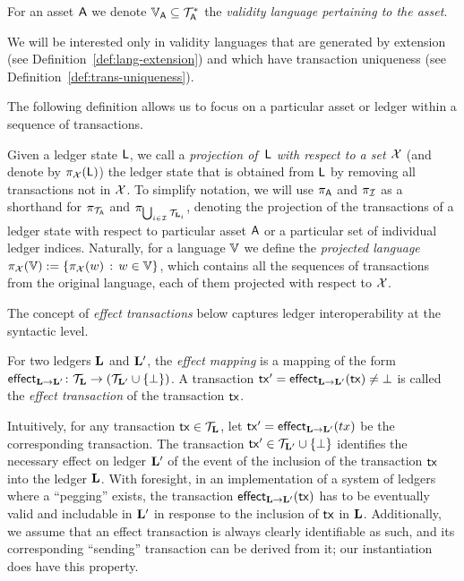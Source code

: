 \begin{definition}
  For an asset $\mathsf{A}$ we denote $\mathbb{V}_{\mathsf{A}} \subseteq \mathcal{T}_{\mathsf{A}}^*$
  the \emph{validity language pertaining to the asset}.
\end{definition}

We will be interested only in validity languages that are generated by extension
(see Definition~\ref{def:lang-extension}) and which have transaction uniqueness
(see Definition~\ref{def:trans-uniqueness}).

The following definition allows us to focus on a particular asset or ledger
within a sequence of transactions.

\begin{definition}
  Given a ledger state $\mathsf{L}$, we call a
  \emph{projection of~$\mathsf{L}$ with respect to a set $\mathcal{X}$}
  (and denote by $\pi_{\mathcal{X}}(\mathsf{L})$) the ledger state that is obtained from
  $\mathsf{L}$ by removing all transactions not in $\mathcal{X}$. To simplify
  notation, we will use $\pi_{\mathsf{A}}$ and $\pi_{\mathcal{I}}$ as a shorthand for
  $\pi_{\mathcal{T}_{\mathsf{A}}}$ and $\pi_{\bigcup_{i\in\mathcal{I}} \mathcal{T}_{\mathbf{L}_i}}$,
  denoting the projection of the transactions of a ledger state with respect to
  particular asset $\mathsf{A}$ or a particular set of individual ledger
  indices.
  Naturally, for a language $\mathbb{V}$ we define the
  \emph{projected language}
  $\pi_{\mathcal{X}}(\mathbb{V}):=\left\{ \pi_{\mathcal{X}}(w) \,:\, w\in\mathbb{V} \right\}$, which
  contains all the sequences of transactions from the original language,
  each of them projected with respect to $\mathcal{X}$.
\end{definition}

The concept of {\em effect transactions} below captures ledger interoperability
at the syntactic level.

\begin{definition}
\label{def:effect}
For two ledgers $\mathbf{L}$ and $\mathbf{L}'$, the \emph{effect mapping} is a
mapping of the form
$
  \mathsf{effect}_{\mathbf{L}\rightarrow \mathbf{L}'}
\colon
\mathcal{T}_{\mathbf{L}}
\to
\left(
  \mathcal{T}_{\mathbf{L}'}
  \cup
  \{\bot\}
\right)
$.
  A transaction $ \mathsf{tx}'=\mathsf{effect}_{\mathbf{L}\rightarrow \mathbf{L}'}(\mathsf{tx}) \neq \bot$ is called the \emph{effect
transaction} of the transaction $\mathsf{tx}$.
\end{definition}

Intuitively, for any transaction $\mathsf{tx}\in\mathcal{T}_{\mathbf{L}}$, let $\mathsf{tx}' = \mathsf{effect}_{\mathbf{L}\rightarrow \mathbf{L}'}(tx)$ be the corresponding transaction. The transaction $\mathsf{tx}' \in \mathcal{T}_{\mathbf{L}'}\cup\{\bot\}$ identifies
the necessary effect on ledger $\mathbf{L}'$ of the  event of the inclusion of the transaction $\mathsf{tx}$ into the ledger
$\mathbf{L}$. With foresight, in an implementation of a  system of ledgers where a ``pegging''   exists, the transaction
$\mathsf{effect}_{\mathbf{L}\rightarrow \mathbf{L}'}(\mathsf{tx})$ has to be eventually valid and includable in
$\mathbf{L}'$ in response to the inclusion of $\mathsf{tx}$ in $\mathbf{L}$.
Additionally, we assume that an effect transaction is
always clearly identifiable as such, and its corresponding ``sending''
transaction can be derived from it; our instantiation does have this property.

